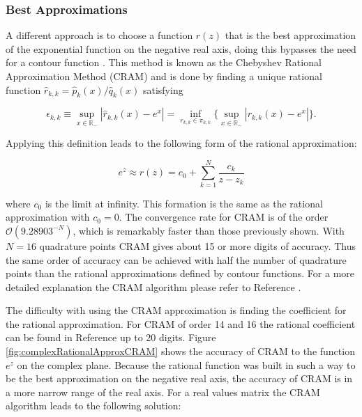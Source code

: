 \subsubsection{Best Approximations}
A different approach is to choose a function $r(z)$ that is the best approximation of the exponential function on the negative real axis, doing this bypasses the need for a contour function \cite{pusaThesis} \cite{Trefethen2006}. This method is known as the Chebyshev Rational Approximation Method (CRAM) and is done by finding a unique rational function $\hat{r}_{k,k} = \hat{p}_{k}(x)/\hat{q}_{k}(x)$ satisfying 

\begin{equation}
    \epsilon_{k,k} \equiv \sup_{x \in \mathbb{R}_{-}} |\hat{r}_{k,k}(x) - e^{x}| = \inf_{r_{k,k} \in \pi_{k,k}}\bigg\{ \sup_{x \in \mathbb{R}_{-}} |r_{k,k}(x) - e^{x}|\bigg\}.
\end{equation}

\noindent Applying this definition leads to the following form of the rational approximation:

\begin{equation}
    e^{z} \approx r(z) = c_{0} + \sum_{k=1}^{N}\frac{c_{k}}{z - z_{k}}
\end{equation}


\noindent where $c_{0}$ is the limit at infinity. This formation is the same as the rational approximation with $c_{0} = 0$. The convergence rate for CRAM is of the order $\mathcal{O}(9.28903^{-N} )$, which is remarkably faster than those previously shown. With $N=16$ quadrature points CRAM gives about 15 or more digits of accuracy. Thus the same order of accuracy can be achieved with half the number of quadrature points than the rational approximations defined by contour functions. For a more detailed explanation the CRAM algorithm please refer to Reference \cite{pusaThesis}. 

The difficulty with using the CRAM approximation is finding the coefficient for the rational approximation. For CRAM of order 14 and 16 the rational coefficient can be found in Reference \cite{pusa2011} up to 20 digits. Figure \ref{fig:complexRationalApproxCRAM} shows the accuracy of CRAM to the function $e^{z}$ on the complex plane. Because the rational function was built in such a way to be the best approximation on the negative real axis, the accuracy of CRAM is in a more narrow range of the real axis. For a real values matrix the CRAM algorithm leads to the following solution:



